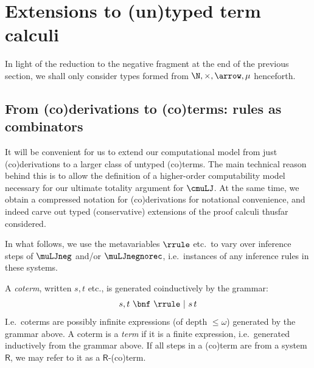 \section{Extensions to (un)typed term calculi}
\label{sec:term-calculi}
In light of the reduction to the negative fragment at the end of the previous section, we shall only consider types formed from $\N, \times, \arrow, \mu$ henceforth.


\subsection{From (co)derivations to (co)terms: rules as combinators}
It will be convenient for us to extend our computational model from just (co)derivations to a larger class of untyped (co)terms.
The main technical reason behind this is to allow the definition of a higher-order computability model necessary for our ultimate totality argument for $\cmuLJ$.
At the same time, we obtain a compressed notation for (co)derivations for notational convenience, and indeed carve out typed (conservative) extensions of the proof calculi thusfar considered.

In what follows, we use the metavariables $\rrule $ etc.\ to vary over inference steps of $\muLJneg$ and/or $\muLJnegnorec$, i.e.\ instances of any inference rules in these systems.
\begin{definition}
 A \emph{coterm}, written $s,t$ etc., is generated coinductively by the grammar:
 \[
 s,t \ \bnf \ \rrule  \ \vert \ s\, t
 \]
I.e.\ coterms are possibly infinite expressions (of depth $\leq \omega$) generated by the grammar above.
A coterm is a \emph{term} if it is a finite expression, i.e.\ generated inductively from the grammar above.
 If all steps in a (co)term are from a system $\mathsf R$, we may refer to it as a $\mathsf R$-(co)term.
% 
\end{definition}

